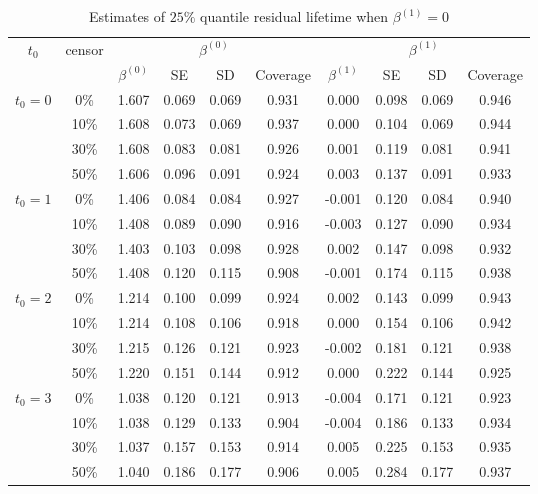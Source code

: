 \documentclass[titlepage,english,12pt]{article}
\begin{document}
	\begin{table}[H] \label{table:1}
		\caption{Estimates of $25\%$ quantile residual lifetime when $\beta^{(1)}=0$}
		\centering
		\begin{tabular}{|c|c|c|c|c|c|c|c|c|c|}
			\hline
			\multirow{2}{*}{$t_0$} & \multirow{2}{*}{censor} & \multicolumn{4}{c|}{$\beta^{(0)}$} & \multicolumn{4}{c|}{$\beta^{(1)}$}\\ \cline{3-10}
			& & $\beta^{(0)}$ & SE & SD  & Coverage  & $\beta^{(1)}$ & SE & SD & Coverage\\
			\hline\hline
			\multirow{4}{*}{$t_0=0$} & 0\% & 1.607 & 0.069 & 0.069 & 0.931 & 0.000 & 0.098 & 0.069 & 0.946 \\
			& 10\% & 1.608 & 0.073 & 0.069 & 0.937 & 0.000 & 0.104 & 0.069 & 0.944 \\
			& 30\% & 1.608 & 0.083 & 0.081 & 0.926 & 0.001 & 0.119 & 0.081 & 0.941 \\
			& 50\% & 1.606 & 0.096 & 0.091 & 0.924 & 0.003 & 0.137 & 0.091 & 0.933 \\
			\hline
			\multirow{4}{*}{$t_0=1$} & 0\% & 1.406 & 0.084 & 0.084 & 0.927 & -0.001 & 0.120 & 0.084 & 0.940 \\
			& 10\% & 1.408 & 0.089 & 0.090 & 0.916 & -0.003 & 0.127 & 0.090 & 0.934 \\
			& 30\% & 1.403& 0.103 & 0.098 & 0.928 & 0.002 & 0.147 & 0.098 & 0.932 \\
			& 50\% & 1.408 & 0.120 & 0.115 & 0.908 & -0.001 & 0.174 & 0.115 & 0.938 \\
			\hline
			\multirow{4}{*}{$t_0=2$} & 0\% & 1.214 & 0.100 & 0.099 & 0.924 & 0.002 & 0.143 & 0.099 & 0.943 \\
			& 10\% & 1.214 & 0.108 & 0.106 & 0.918 & 0.000 & 0.154 & 0.106 & 0.942 \\
			& 30\% & 1.215 & 0.126 & 0.121 & 0.923 & -0.002 & 0.181 & 0.121 & 0.938 \\
			& 50\% & 1.220 & 0.151 & 0.144 & 0.912 & 0.000 & 0.222 & 0.144 & 0.925 \\
			\hline
			\multirow{4}{*}{$t_0=3$} & 0\% & 1.038 & 0.120 & 0.121 & 0.913 & -0.004 & 0.171 & 0.121 & 0.923 \\
			& 10\% & 1.038 & 0.129 & 0.133 & 0.904 & -0.004 & 0.186 & 0.133 & 0.934 \\
			& 30\% & 1.037 & 0.157 & 0.153 & 0.914 & 0.005 & 0.225 & 0.153 & 0.935 \\
			& 50\% & 1.040 & 0.186 & 0.177 & 0.906 & 0.005 & 0.284 & 0.177 & 0.937 \\
			\hline
		\end{tabular}
	\end{table}
\end{document}
